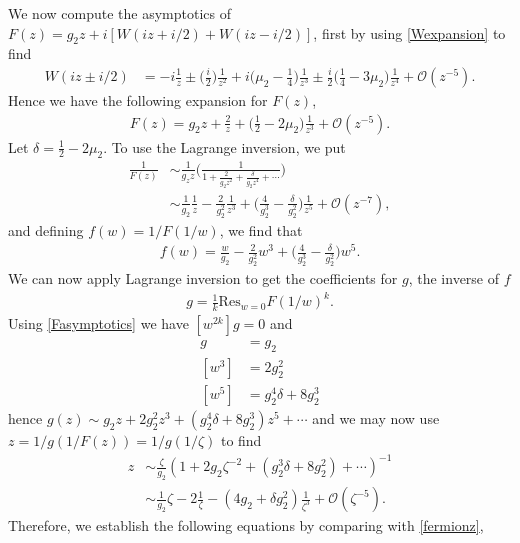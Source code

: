 \documentclass[10pt]{article}
\newcommand{\mcal}[1]{\mathcal{#1}}
\newcommand{\res}{\text{Res}}
\theoremstyle{plain}
\theoremstyle{definition}
\theoremstyle{plain}
\begin{document}
We now compute the asymptotics of $F(z)=g_2z+i[W(iz+i/2)+W(iz-i/2)]$, first by using \ref{Wexpansion} to find
\begin{align*}
	W(iz\pm i/2) &= -i\frac{1}{z} \pm \bigg(\frac{i}{2}\bigg)\frac{1}{z^2} + i \bigg(\mu_2 - \frac{1}{4}\bigg)\frac{1}{z^3} \pm\frac{i}{2}\bigg( \frac{1}{4}-3\mu_2 \bigg)\frac{1}{z^4} + \mcal{O}(z^{-5}).
\end{align*}
Hence we have the following expansion for $F(z)$,
\begin{align}
	F(z) = g_2z +  \frac{2}{z} + \bigg(\frac{1}{2}-2\mu_2\bigg)\frac{1}{z^3} + \mcal{O}(z^{-5}). \label{Fasymptotics}
\end{align}
    Let $\delta=\frac{1}{2}-2\mu_2$. To use the Lagrange inversion, we put
\begin{align*}
	\frac{1}{F(z)} &\sim \frac{1}{g_z z} \bigg( \frac{1}{1 + \frac{2}{g_2 z^2} + \frac{\delta}{g_2z^4} + \cdots}  \bigg) \\
	&\sim \frac{1}{g_2}\frac{1}{z} - \frac{2}{g_2^2}\frac{1}{z^3} + \bigg( \frac{4}{g_2^3}-\frac{\delta}{g_2^2} \bigg)\frac{1}{z^5} + \mcal{O}(z^{-7}),
\end{align*}
and defining $f(w) = 1/F(1/w)$, we find that
\begin{align*}
	f(w) = \frac{w}{g_2} - \frac{2}{g_2^2}w^3 + \bigg( \frac{4}{g_2^3}-\frac{\delta}{g_2^2} \bigg)w^5.
\end{align*}
We can now apply Lagrange inversion to get the coefficients for $g$, the inverse of $f$
\begin{align*}
	[w^k]g = \frac{1}{k} \res_{w=0} F(1/w)^k.
\end{align*} 
Using \ref{Fasymptotics} we have $[w^{2k}]g=0$ and 
\begin{align*}
	[w]g &= g_2 \\ 
	[w^3] &= 2g_2^2\\
	[w^5] &= g_2^4\delta + 8g_2^3
\end{align*}
hence $g(z)\sim g_2z + 2g_2^2 z^3 + (g_2^4 \delta + 8g_2^3)z^5 + \cdots$ and we may now use $z = 1/g(1/F(z))=1/g(1/\zeta)$ to find
\begin{align*}
	z &\sim \frac{\zeta}{g_2}(1+2g_2\zeta^{-2} + (g_2^3\delta + 8g_2^2)+\cdots)^{-1} \\
	&\sim \frac{1}{g_2}\zeta - 2\frac{1}{\zeta} - (4g_2 + \delta g_2^2)\frac{1}{\zeta^3}+\mcal{O}(\zeta^{-5}).
\end{align*}
Therefore, we establish the following equations by comparing with \ref{fermionz},
\end{document}
